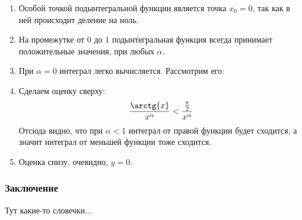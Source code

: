 \documentclass{article}
\begin{document}
\begin{enumerate}
    \item Особой точкой подынтегральной функции является точка $x_0 = 0$, так как в ней происходит деление на ноль.
    \item На промежутке от 0 до 1 подынтегральная функция всегда принимает положительные значения, при любых $\alpha$.
    \item При $\alpha = 0$ интеграл легко вычисляется. Рассмотрим его:
    

    \item Сделаем оценку сверху:
    $$
    \frac{\arctg{x}}{x^{\alpha}} < \frac{\frac{\pi}{2}}{x^{\alpha}}
    $$
    Отсюда видно, что при $\alpha<1$ интеграл от правой функции будет сходится, а значит интеграл от меньшей функции тоже сходится.

    \item Оценка снизу, очевидно, $y = 0$.

\end{enumerate}

\subsubsection*{Заключение}

Тут какие-то словечки...

\newpage
\end{document}
